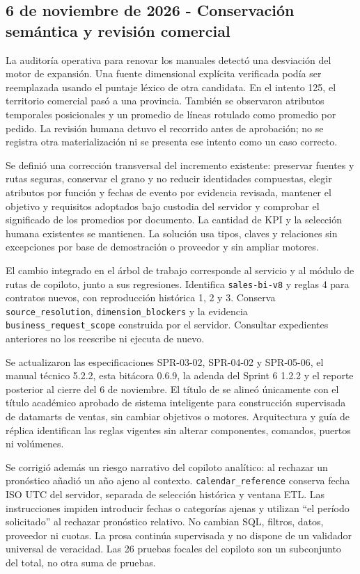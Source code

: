 \documentclass[11pt,letterpaper]{article}
\newcommand{\file}[1]{\texttt{#1}}
\begin{document}
\subsection{6 de noviembre de 2026 - Conservación semántica y revisión comercial}

La auditoría operativa para renovar los manuales detectó una desviación del
motor de expansión. Una fuente dimensional explícita verificada podía ser
reemplazada usando el puntaje léxico de otra candidata. En el intento 125, el
territorio comercial pasó a una provincia. También se observaron atributos
temporales posicionales y un promedio de líneas rotulado como promedio por
pedido. La revisión humana detuvo el recorrido antes de aprobación; no se
registra otra materialización ni se presenta ese intento como un caso correcto.

Se definió una corrección transversal del incremento existente: preservar
fuentes y rutas seguras, conservar el grano y no reducir identidades compuestas,
elegir atributos por función y fechas de evento por evidencia revisada, mantener
el objetivo y requisitos adoptados bajo custodia del servidor y comprobar el
significado de los promedios por documento. La cantidad de KPI y la selección
humana existentes se mantienen. La solución usa tipos, claves y relaciones
sin excepciones por base de demostración o proveedor y sin ampliar motores.

El cambio integrado en el árbol de trabajo corresponde al servicio y al módulo de rutas de copiloto,
junto a sus regresiones. Identifica \file{sales-bi-v8} y reglas 4 para contratos
nuevos, con reproducción histórica 1, 2 y 3. Conserva
\file{source\_resolution}, \file{dimension\_blockers} y la evidencia
\file{business\_request\_scope} construida por el servidor. Consultar expedientes
anteriores no los reescribe ni ejecuta de nuevo.

Se actualizaron las especificaciones SPR-03-02, SPR-04-02 y SPR-05-06, el manual
técnico 5.2.2, esta bitácora 0.6.9, la adenda del Sprint 6 1.2.2 y el reporte
posterior al cierre del 6 de noviembre. El título de
 se alineó únicamente con el título académico
aprobado de sistema inteligente para construcción supervisada de datamarts de
ventas, sin cambiar objetivos o motores. Arquitectura y guía de réplica identifican las
reglas vigentes sin alterar componentes, comandos, puertos ni volúmenes.

Se corrigió además un riesgo narrativo del copiloto analítico: al rechazar un
pronóstico añadió un año ajeno al contexto. \file{calendar\_reference} conserva
fecha ISO UTC del servidor, separada de selección histórica y ventana ETL. Las
instrucciones impiden introducir fechas o categorías ajenas y utilizan ``el período
solicitado'' al rechazar pronóstico relativo. No cambian SQL, filtros, datos,
proveedor ni cuotas. La prosa continúa supervisada y no dispone de un validador
universal de veracidad. Las 26 pruebas focales del copiloto son un subconjunto del
total, no otra suma de pruebas.
\end{document}
